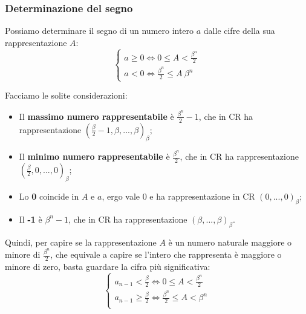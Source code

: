 \documentclass[a4paper,11pt]{article}
\begin{document}
\subsubsection{Determinazione del segno}
Possiamo determinare il segno di un numero intero $a$ dalle cifre della sua rappresentazione $A$:
\[
	\begin{cases}
		a \geq 0 \Leftrightarrow 0 \leq A < \frac{\beta^n}{2} \\	
		a < 0 \Leftrightarrow \frac{\beta^n}{2} \leq A \ \beta^n	
	\end{cases}
\]

Facciamo le solite considerazioni:

\begin{itemize}
	\item Il \textbf{massimo numero rappresentabile} è $\frac{\beta^n}{2} - 1$, che in CR ha rappresentazione $\left( \frac{\beta}{2} - 1, \beta, ..., \beta \right)_\beta$;
	\item Il \textbf{minimo numero rappresentabile} è $\frac{\beta^n}{2}$, che in CR ha rappresentazione $\left( \frac{\beta}{2}, 0, ..., 0 \right)_\beta$;
	\item Lo \textbf{0} coincide in $A$ e $a$, ergo vale 0 e ha rappresentazione in CR $\left( 0, ..., 0 \right)_\beta$;
	\item Il \textbf{-1} è $\beta^n-1$, che in CR ha rappresentazione $\left( \beta, ..., \beta \right)_\beta$.
\end{itemize}

Quindi, per capire se la rappresentazione $A$ è un numero naturale maggiore o minore di $\frac{\beta^n}{2}$, che equivale a capire se l'intero che rappresenta è maggiore o minore di zero, basta guardare la cifra più significativa:
\[
	\begin{cases}
		a_{n-1} < \frac{\beta}{2} \Leftrightarrow 0 \leq A < \frac{\beta^n}{2} \\ 	
		a_{n-1} \geq \frac{\beta}{2} \Leftrightarrow \frac{\beta^n}{2} \leq A < \beta^n \\ 	
	\end{cases}
\]

\end{document}
